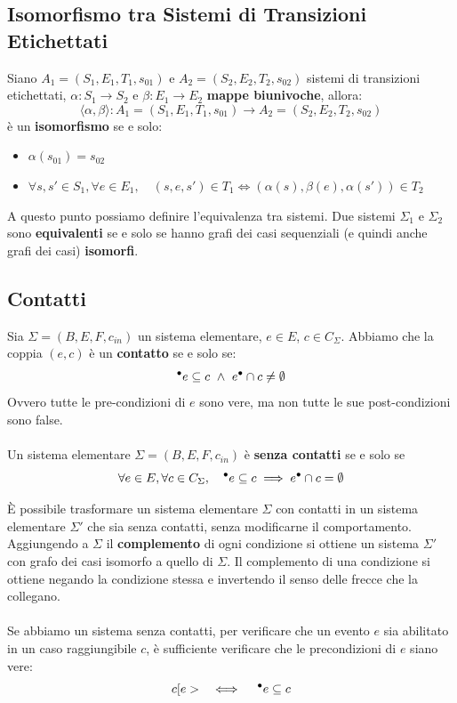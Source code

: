 \subsection{Isomorfismo tra Sistemi di Transizioni Etichettati}
Siano $A_1 = (S_1, E_1, T_1, s_{01})$ e $A_2 = (S_2, E_2, T_2, s_{02})$ sistemi di transizioni etichettati,
$\alpha : S_1 \to S_2$ e $\beta : E_1 \to E_2$ \textbf{mappe biunivoche}, allora:
\[
	\langle \alpha, \beta \rangle : A_1 = (S_1, E_1, T_1, s_{01}) \to A_2 = (S_2, E_2, T_2, s_{02})
\]
\noindent
è un \textbf{isomorfismo} se e solo:
\begin{itemize}
	\item $\alpha (s_{01}) = s_{02}$
	\item $\forall s, s' \in S_1, \forall e \in E_1, \quad (s, e, s') \in T_1 \iff (\alpha(s), \beta(e), \alpha(s')) \in T_2$
\end{itemize}

\noindent
A questo punto possiamo definire l'equivalenza tra sistemi. Due sistemi $\Sigma_1$ e $\Sigma_2$ sono \textbf{equivalenti} se e solo se hanno grafi dei casi sequenziali (e quindi anche grafi dei casi) \textbf{isomorfi}.

\subsection{Contatti}

Sia $\Sigma = (B, E, F, c_{in})$ un sistema elementare, $e \in E$, $c \in C_\Sigma$. Abbiamo che la coppia $(e, c)$ è un \textbf{contatto} se e solo se:
\[
	\prescript{\bullet}{}{e} \subseteq c \ \wedge \ e^\bullet \cap c \neq \emptyset
\]
\noindent
Ovvero tutte le pre-condizioni di $e$ sono vere, ma non tutte le sue post-condizioni sono false.
\\
\\
Un sistema elementare $\Sigma = (B, E, F, c_{in})$ è \textbf{senza contatti} se e solo se
\[
	\forall e \in E, \forall c \in C_\Sigma,
	\quad
	\prescript{\bullet}{}{e} \subseteq c \implies e^\bullet \cap c = \emptyset
\]

\noindent
È possibile trasformare un sistema elementare $\Sigma$ con contatti in un sistema elementare $\Sigma'$ che sia senza contatti, senza modificarne il comportamento. Aggiungendo a $\Sigma$ il \textbf{complemento} di ogni condizione si ottiene un sistema $\Sigma'$ con grafo dei casi isomorfo a quello di $\Sigma$. Il complemento di una condizione si ottiene negando la condizione stessa e invertendo il senso delle frecce che la collegano.
\\
\\
Se abbiamo un sistema senza contatti, per verificare che un evento $e$ sia abilitato in un caso raggiungibile $c$, è sufficiente verificare che le precondizioni di $e$ siano vere:
\[
	c[e> \quad \iff \quad \prescript{\bullet}{}{e} \subseteq c
\]

